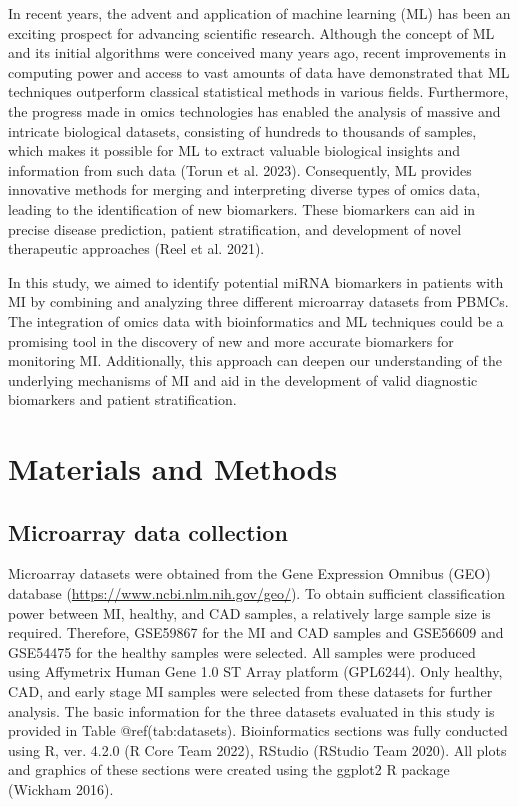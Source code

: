 \documentclass[
]{article}
\begin{document}
In recent years, the advent and application of machine learning (ML) has
been an exciting prospect for advancing scientific research. Although
the concept of ML and its initial algorithms were conceived many years
ago, recent improvements in computing power and access to vast amounts
of data have demonstrated that ML techniques outperform classical
statistical methods in various fields. Furthermore, the progress made in
omics technologies has enabled the analysis of massive and intricate
biological datasets, consisting of hundreds to thousands of samples,
which makes it possible for ML to extract valuable biological insights
and information from such data (Torun et al. 2023). Consequently, ML
provides innovative methods for merging and interpreting diverse types
of omics data, leading to the identification of new biomarkers. These
biomarkers can aid in precise disease prediction, patient
stratification, and development of novel therapeutic approaches (Reel et
al. 2021).

In this study, we aimed to identify potential miRNA biomarkers in
patients with MI by combining and analyzing three different microarray
datasets from PBMCs. The integration of omics data with bioinformatics
and ML techniques could be a promising tool in the discovery of new and
more accurate biomarkers for monitoring MI. Additionally, this approach
can deepen our understanding of the underlying mechanisms of MI and aid
in the development of valid diagnostic biomarkers and patient
stratification.

\hypertarget{materials-and-methods}{%
\section{Materials and Methods}\label{materials-and-methods}}

\hypertarget{microarray-data-collection}{%
\subsection{Microarray data
collection}\label{microarray-data-collection}}

Microarray datasets were obtained from the Gene Expression Omnibus (GEO)
database (\url{https://www.ncbi.nlm.nih.gov/geo/}). To obtain sufficient
classification power between MI, healthy, and CAD samples, a relatively
large sample size is required. Therefore, GSE59867 for the MI and CAD
samples and GSE56609 and GSE54475 for the healthy samples were selected.
All samples were produced using Affymetrix Human Gene 1.0 ST Array
platform (GPL6244). Only healthy, CAD, and early stage MI samples were
selected from these datasets for further analysis. The basic information
for the three datasets evaluated in this study is provided in Table
@ref(tab:datasets). Bioinformatics sections was fully conducted using R,
ver. 4.2.0 (R Core Team 2022), RStudio (RStudio Team 2020). All plots
and graphics of these sections were created using the ggplot2 R package
(Wickham 2016).
\end{document}
